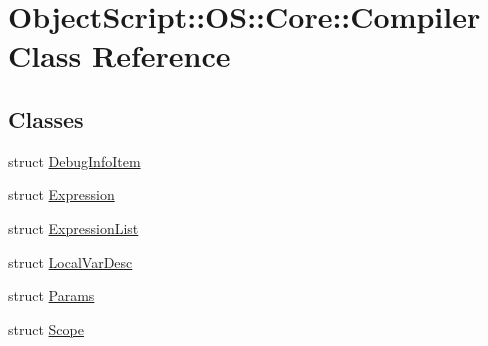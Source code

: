 \hypertarget{class_object_script_1_1_o_s_1_1_core_1_1_compiler}{}\section{Object\+Script\+:\+:OS\+:\+:Core\+:\+:Compiler Class Reference}
\label{class_object_script_1_1_o_s_1_1_core_1_1_compiler}
\subsection*{Classes}
\begin{DoxyCompactItemize}
\item 
struct \hyperlink{struct_object_script_1_1_o_s_1_1_core_1_1_compiler_1_1_debug_info_item}{Debug\+Info\+Item}
\item 
struct \hyperlink{struct_object_script_1_1_o_s_1_1_core_1_1_compiler_1_1_expression}{Expression}
\item 
struct \hyperlink{struct_object_script_1_1_o_s_1_1_core_1_1_compiler_1_1_expression_list}{Expression\+List}
\item 
struct \hyperlink{struct_object_script_1_1_o_s_1_1_core_1_1_compiler_1_1_local_var_desc}{Local\+Var\+Desc}
\item 
struct \hyperlink{struct_object_script_1_1_o_s_1_1_core_1_1_compiler_1_1_params}{Params}
\item 
struct \hyperlink{struct_object_script_1_1_o_s_1_1_core_1_1_compiler_1_1_scope}{Scope}
\end{DoxyCompactItemize}
